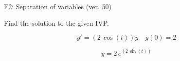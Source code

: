 \begin{exercise}
  \begin{exerciseTitle}F2: Separation of variables (ver. 50)\end{exerciseTitle}
  \begin{exerciseStatement}
    
Find the solution to the given IVP.

    
\[y'=( 2 \, \cos\left(t\right) )y\hspace{1em} y(0)= 2\]

  \end{exerciseStatement}
  \begin{exerciseAnswer}
    
\[y= 2 \, e^{\left(2 \, \sin\left(t\right)\right)}\]

  \end{exerciseAnswer}
\end{exercise}